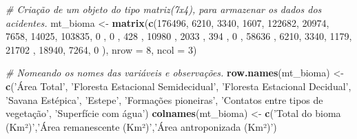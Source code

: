 \documentclass[portuguese,]{article}
\newenvironment{Shaded}{\begin{snugshade}}{\end{snugshade}}
\newcommand{\KeywordTok}[1]{\textcolor[rgb]{0.13,0.29,0.53}{\textbf{#1}}}
\newcommand{\DataTypeTok}[1]{\textcolor[rgb]{0.13,0.29,0.53}{#1}}
\newcommand{\DecValTok}[1]{\textcolor[rgb]{0.00,0.00,0.81}{#1}}
\newcommand{\StringTok}[1]{\textcolor[rgb]{0.31,0.60,0.02}{#1}}
\newcommand{\CommentTok}[1]{\textcolor[rgb]{0.56,0.35,0.01}{\textit{#1}}}
\newcommand{\NormalTok}[1]{#1}
\begin{document}
\begin{Shaded}
\begin{Highlighting}[]
\CommentTok{# Criação de um objeto do tipo matriz(7x4), para armazenar os dados dos acidentes.}
\NormalTok{mt_bioma <-}\StringTok{ }\KeywordTok{matrix}\NormalTok{(}\KeywordTok{c}\NormalTok{(}\DecValTok{176496}\NormalTok{, }\DecValTok{6210}\NormalTok{, }\DecValTok{3340}\NormalTok{, }\DecValTok{1607}\NormalTok{, }\DecValTok{122682}\NormalTok{, }\DecValTok{20974}\NormalTok{, }\DecValTok{7658}\NormalTok{, }\DecValTok{14025}\NormalTok{,}
                         \DecValTok{103835}\NormalTok{, }\DecValTok{0}\NormalTok{   , }\DecValTok{0}\NormalTok{   , }\DecValTok{428}\NormalTok{ , }\DecValTok{10980}\NormalTok{ , }\DecValTok{2033}\NormalTok{ , }\DecValTok{394}\NormalTok{ , }\DecValTok{0}\NormalTok{    ,}
                         \DecValTok{58636}\NormalTok{ , }\DecValTok{6210}\NormalTok{, }\DecValTok{3340}\NormalTok{, }\DecValTok{1179}\NormalTok{, }\DecValTok{21702}\NormalTok{ , }\DecValTok{18940}\NormalTok{, }\DecValTok{7264}\NormalTok{, }\DecValTok{0}\NormalTok{   ),}
                       \DataTypeTok{nrow =} \DecValTok{8}\NormalTok{,}
                       \DataTypeTok{ncol =} \DecValTok{3}\NormalTok{)}

\CommentTok{# Nomeando os nomes das variáveis e observações. }
\KeywordTok{row.names}\NormalTok{(mt_bioma) <-}\StringTok{ }\KeywordTok{c}\NormalTok{(}\StringTok{'Área Total'}\NormalTok{,}
                             \StringTok{'Floresta Estacional Semidecidual'}\NormalTok{,}
                             \StringTok{'Floresta Estacional Decidual'}\NormalTok{,}
                             \StringTok{'Savana Estépica'}\NormalTok{,}
                             \StringTok{'Estepe'}\NormalTok{,}
                             \StringTok{'Formações pioneiras'}\NormalTok{,}
                             \StringTok{'Contatos entre tipos de vegetação'}\NormalTok{,}
                             \StringTok{'Superfície com água'}\NormalTok{)}
\KeywordTok{colnames}\NormalTok{(mt_bioma) <-}\StringTok{ }\KeywordTok{c}\NormalTok{(}\StringTok{'Total do bioma (Km²)'}\NormalTok{,}\StringTok{'Área remanescente (Km²)'}\NormalTok{,}\StringTok{'Área antroponizada (Km²)'}\NormalTok{)}
\end{Highlighting}
\end{Shaded}
\end{document}
